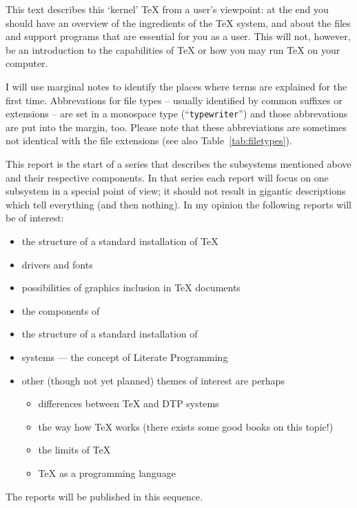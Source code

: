 This text describes this `kernel' \TeX{} from a user's viewpoint: at
the end you should have an overview of the ingredients of the \TeX{}
system, and about the files and support programs that are essential
for you as a user. This will not, however, be an introduction to the
capabilities of \TeX{} or how you may run \TeX{} on your computer.

I will use marginal notes to identify the places where terms are
explained for the first time. Abbrevations for file types -- usually
identified by common suffixes or extensions -- are set in a monospace
type (``{\tt typewriter\/}'') and those abbrevations are put into the
margin, too. Please note that these abbreviations are sometimes not
identical with the file extensions (see also
Table~\ref{tab:filetypes}).

This report is the start of a series that describes the subsystems
mentioned above and their respective components. In that series each
report will focus on one subsystem in a special point of view; it
should not result in gigantic descriptions which tell everything (and
then nothing). In my opinion the following reports will be of
interest:
 \begin{itemize}

\item the structure of a standard installation of \TeX{}
\item \DVI{} drivers and fonts
\item possibilities of graphics inclusion in \TeX{} documents
\item the components of \MF{}
\item the structure of a standard installation of \MF{}
\item \WEB{} systems --- the concept of Literate Programming
\item other (though not yet planned) themes of interest are perhaps
\begin{itemize}
\item differences between \TeX{} and DTP systems
\item the way how \TeX{} works (there exists some good books on this topic!)
\item the limits of \TeX{}
\item \TeX{} as a programming language
\end{itemize}

 \end{itemize}
 The reports will be published in this sequence.




